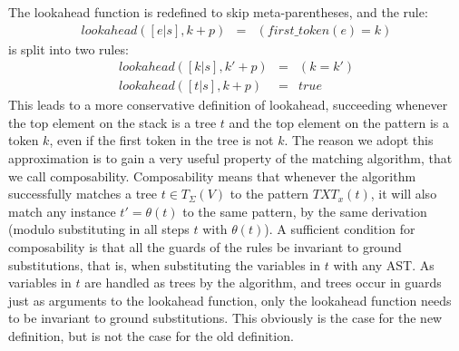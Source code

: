 \documentclass{sigplanconf}
\begin{document}
The lookahead function is redefined to skip meta-parentheses, and the rule:
\begin{eqnarray*}
lookahead([e | s], k+p)&=& (first\_token(e)=k)
\end{eqnarray*}
is split into two rules:
\begin{eqnarray*}
lookahead([k | s], k'+p)&=& (k=k') \\
lookahead([t | s], k+p)&=& true
\end{eqnarray*}
This leads to a more conservative definition of lookahead, succeeding
whenever the top element on the stack is a tree $t$ and the top
element on the pattern is a token $k$, even if the first token in the
tree is not $k$. The reason we adopt this approximation is to gain a
very useful property of the matching algorithm, that we call
composability. Composability means that whenever the algorithm
successfully matches a tree $t \in T_\Sigma(V)$ to the pattern
$TXT_x(t)$, it will also match any instance $t' = \theta(t)$ to the
same pattern, by the same derivation (modulo substituting in all steps
$t$ with $\theta(t)$). A sufficient condition for composability is
that all the guards of the rules be invariant to ground substitutions,
that is, when substituting the variables in $t$ with any AST. As
variables in $t$ are handled as trees by the algorithm, and trees
occur in guards just as arguments to the lookahead function, only the
lookahead function needs to be invariant to ground substitutions. This
obviously is the case for the new definition, but is not the case for
the old definition.

\end{document}
